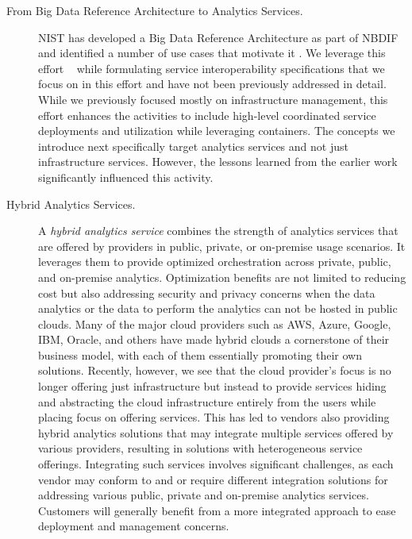 \begin{description}

\item[From Big Data Reference Architecture to Analytics Services.]
\label{s:arch} NIST has developed a Big Data Reference Architecture as part of
NBDIF\cite{nist-v6} and identified a number of use cases that motivate
it \cite{nist-v3}. We leverage this effort
~\cite{nist-v1,nist-v2,nist-v3,nist-v4,nist-v5,nist-v6,nist-v7,nist-v8,nist-v9}
while formulating service interoperability specifications that we
focus on in this effort and have not been previously addressed in
detail. While we previously focused mostly on infrastructure
management, this effort enhances the activities to include high-level
coordinated service deployments and utilization while leveraging
containers. The concepts we introduce next specifically target
analytics services and not just infrastructure services.  However, the
lessons learned from the earlier work significantly influenced this
activity.


\item[Hybrid Analytics Services.]

A {\em hybrid analytics service} combines the strength of analytics
services that are offered by providers in public, private, or
on-premise usage scenarios. It leverages them to provide optimized
orchestration across private, public, and on-premise
analytics. Optimization benefits are not limited to reducing cost but
also addressing security and privacy concerns when the data analytics
or the data to perform the analytics can not be hosted in public
clouds. Many of the major cloud providers such as AWS, Azure, Google,
IBM, Oracle, and others have made hybrid clouds a cornerstone of their
business model, with each of them essentially promoting their own
solutions. Recently, however, we see that the cloud provider's focus
is no longer offering just infrastructure but instead to provide
services hiding and abstracting the cloud infrastructure entirely from
the users while placing focus on offering services. This has led to
vendors also providing hybrid analytics solutions that may integrate
multiple services offered by various providers, resulting in solutions
with heterogeneous service offerings. Integrating such services
involves significant challenges, as each vendor may conform to and or
require different integration solutions for addressing various public,
private and on-premise analytics services. Customers will generally
benefit from a more integrated approach to ease deployment and
management concerns.


\end{description}
